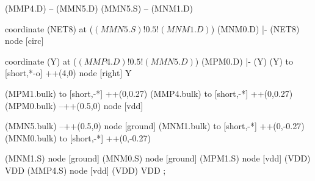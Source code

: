 \begin{circuitikz}[american]
	(MMP4.D) -- (MMN5.D)
	(MMN5.S) -- (MNM1.D)
	
	coordinate (NET8) at ($(MMN5.S)!0.5!(MNM1.D)$)
	(MNM0.D) |- (NET8) node [circ] {}
	
	coordinate (Y) at ($(MMP4.D)!0.5!(MMN5.D)$)
	(MPM0.D) |- (Y)
	(Y) to [short,*-o] ++(4,0) node [right] {Y}
	
	(MPM1.bulk) to [short,-*] ++(0,0.27)
	(MMP4.bulk) to [short,-*] ++(0,0.27)	
	(MPM0.bulk) --++(0.5,0) node [vdd]{}
	
	(MMN5.bulk) --++(0.5,0) node [ground]{}
	(MNM1.bulk) to [short,-*] ++(0,-0.27) 
	(MNM0.bulk) to [short,-*] ++(0,-0.27) 


	(MNM1.S) node [ground] {}
	(MNM0.S) node [ground] {}
	(MPM1.S) node [vdd] (VDD) {VDD}
	(MMP4.S) node [vdd] (VDD) {VDD}
;

\end{circuitikz}
